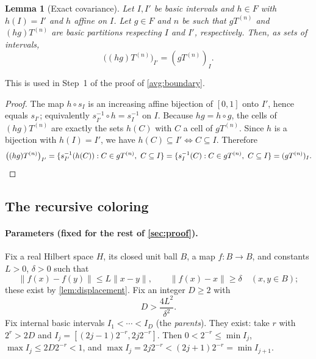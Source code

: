 \documentclass[11pt]{article}
\newcommand{\norm}[1]{\lVert #1\rVert}
\newtheorem{lemma}[theorem]{Lemma}
\theoremstyle{definition}
\numberwithin{equation}{section}
\begin{document}
\begin{lemma}[Exact covariance]\label{dyad:covariancelemma}
Let \(I,I'\) be basic intervals and \(h\in F\) with \(h(I)=I'\) and \(h\)
affine on \(I\). Let \(g\in F\) and \(n\) be such that \(gT^{(n)}\) and
\((hg)T^{(n)}\) are basic partitions respecting \(I\) and \(I'\),
respectively. Then, as sets of intervals,
\begin{equation}\label{dyad:covariance}
  \bigl((hg)T^{(n)}\bigr)_{I'}=(gT^{(n)})_I .
\end{equation}
\end{lemma}
This is used in Step~1 of the proof of \cref{avg:boundary}.

\begin{proof}
The map \(h\circ s_I\) is an increasing affine bijection of \([0,1]\) onto
\(I'\), hence equals \(s_{I'}\); equivalently
\(s_{I'}^{-1}\circ h=s_I^{-1}\) on \(I\). Because \(hg=h\circ g\), the cells
of \((hg)T^{(n)}\) are exactly the sets \(h(C)\) with \(C\) a cell of
\(gT^{(n)}\). Since \(h\) is a bijection with \(h(I)=I'\), we have
\(h(C)\subseteq I'\iff C\subseteq I\). Therefore
\[
 \bigl((hg)T^{(n)}\bigr)_{I'}
 =\{s_{I'}^{-1}(h(C)):C\in gT^{(n)},\ C\subseteq I\}
 =\{s_I^{-1}(C):C\in gT^{(n)},\ C\subseteq I\}
 =(gT^{(n)})_I.\qedhere
\]
\end{proof}

\subsection{The recursive coloring}\label{sec:coloring}

\paragraph{Parameters (fixed for the rest of \cref{sec:proof}).}
Fix a real Hilbert space \(H\), its closed unit ball \(B\), a map
\(f:B\to B\), and constants \(L>0\), \(\delta>0\) such that
\begin{equation}\label{color:map}
  \norm{f(x)-f(y)}\leq L\norm{x-y},\qquad
  \norm{f(x)-x}\geq\delta
  \quad(x,y\in B);
\end{equation}
these exist by \cref{lem:displacement}. Fix an integer \(D\geq2\) with
\begin{equation}\label{color:parameters}
  D>\frac{4L^2}{\delta^2}.
\end{equation}
Fix internal basic intervals \(I_1<\cdots<I_D\) (the \emph{parents}). They
exist: take \(r\) with \(2^r>2D\) and \(I_j=[(2j-1)2^{-r},2j2^{-r}]\). Then
\(0<2^{-r}\le\min I_j\), \(\max I_j\le2D2^{-r}<1\), and
\(\max I_j=2j2^{-r}<(2j+1)2^{-r}=\min I_{j+1}\).
\end{document}
